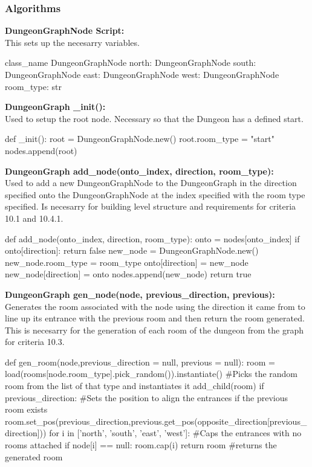 \documentclass{article}
\begin{document}
        \subsubsection{Algorithms}
        \textbf{DungeonGraphNode Script:}\\
        This sets up the necesarry variables.\\
        \begin{python}
class_name DungeonGraphNode
north: DungeonGraphNode
south: DungeonGraphNode
east: DungeonGraphNode
west: DungeonGraphNode
room_type: str
        \end{python}
        \textbf{DungeonGraph \_init():}\\
        Used to setup the root node. Necessary so that the Dungeon has a defined start.\\
        \begin{python}
def _init():
   root = DungeonGraphNode.new()
   root.room_type = "start"
   nodes.append(root)
        \end{python}
        \textbf{DungeonGraph add\_node(onto\_index, direction, room\_type):}\\
        Used to add a new DungeonGraphNode to the DungeonGraph in the direction specified onto the DungeonGraphNode at the index specified with the room type specified. Is necesarry for building level structure and requirements for criteria 10.1 and 10.4.1.\\
        \begin{python}
def add_node(onto_index, direction, room_type):
   onto = nodes[onto_index]
   if onto[direction]:
      return false
   new_node = DungeonGraphNode.new()
   new_node.room_type = room_type
   onto[direction] = new_node
   new_node[direction] = onto
   nodes.append(new_node)
   return true
        \end{python}
        \textbf{DungeonGraph gen\_node(node, previous\_direction, previous):}\\
        Generates the room associated with the node using the direction it came from to line up its entrance with the previous room and then return the room generated. This is necesarry for the generation of each room of the dungeon from the graph for criteria 10.3.\\
        \begin{python}
def gen_room(node,previous_direction = null, previous = null):
   room = load(rooms[node.room_type].pick_random()).instantiate() #Picks the random room from the list of that type and instantiates it
   add_child(room)
   if previous_direction: #Sets the position to align the entrances if the previous room exists
      room.set_pos(previous_direction,previous.get_pos(opposite_direction[previous_direction]))
   for i in ['north', 'south', 'east', 'west']: #Caps the entrances with no rooms attached
      if node[i] == null:
         room.cap(i)
   return room #returns the generated room
        \end{python}
\end{document}
